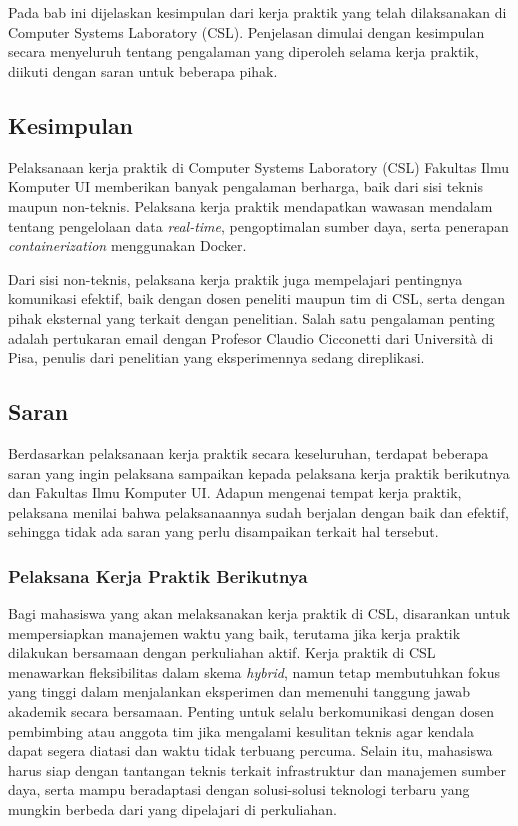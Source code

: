 \chapter{\babTiga}
\label{bab:3}

Pada bab ini dijelaskan kesimpulan dari kerja praktik yang telah dilaksanakan di Computer Systems Laboratory (CSL). Penjelasan dimulai dengan kesimpulan secara menyeluruh tentang pengalaman yang diperoleh selama kerja praktik, diikuti dengan saran untuk beberapa pihak.

\section{Kesimpulan}

Pelaksanaan kerja praktik di Computer Systems Laboratory (CSL) Fakultas Ilmu Komputer UI memberikan banyak pengalaman berharga, baik dari sisi teknis maupun non-teknis. Pelaksana kerja praktik mendapatkan wawasan mendalam tentang pengelolaan data \textit{real-time}, pengoptimalan sumber daya, serta penerapan \textit{containerization} menggunakan Docker.

Dari sisi non-teknis, pelaksana kerja praktik juga mempelajari pentingnya komunikasi efektif, baik dengan dosen peneliti maupun tim di CSL, serta dengan pihak eksternal yang terkait dengan penelitian. Salah satu pengalaman penting adalah pertukaran email dengan Profesor Claudio Cicconetti dari Università di Pisa, penulis dari penelitian yang eksperimennya sedang direplikasi.

\section{Saran}

Berdasarkan pelaksanaan kerja praktik secara keseluruhan, terdapat beberapa saran yang ingin pelaksana sampaikan kepada pelaksana kerja praktik berikutnya dan Fakultas Ilmu Komputer UI. Adapun mengenai tempat kerja praktik, pelaksana menilai bahwa pelaksanaannya sudah berjalan dengan baik dan efektif, sehingga tidak ada saran yang perlu disampaikan terkait hal tersebut.

\subsection{Pelaksana Kerja Praktik Berikutnya}

Bagi mahasiswa yang akan melaksanakan kerja praktik di CSL, disarankan untuk mempersiapkan manajemen waktu yang baik, terutama jika kerja praktik dilakukan bersamaan dengan perkuliahan aktif. Kerja praktik di CSL menawarkan fleksibilitas dalam skema \textit{hybrid}, namun tetap membutuhkan fokus yang tinggi dalam menjalankan eksperimen dan memenuhi tanggung jawab akademik secara bersamaan. Penting untuk selalu berkomunikasi dengan dosen pembimbing atau anggota tim jika mengalami kesulitan teknis agar kendala dapat segera diatasi dan waktu tidak terbuang percuma. Selain itu, mahasiswa harus siap dengan tantangan teknis terkait infrastruktur dan manajemen sumber daya, serta mampu beradaptasi dengan solusi-solusi teknologi terbaru yang mungkin berbeda dari yang dipelajari di perkuliahan.

